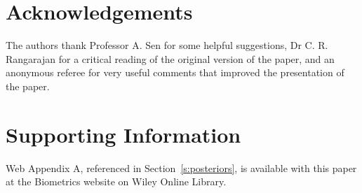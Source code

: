 \documentclass[useAMS,usenatbib]{biom}
\begin{document}
\backmatter


\section*{Acknowledgements}

The authors thank Professor A. Sen for some helpful suggestions,
Dr C. R. Rangarajan for a critical reading of the original version of the
paper, and an anonymous referee for very useful comments that improved
the presentation of the paper.\vspace*{-8pt}




%
%   
% 

  





\section*{Supporting Information}

Web Appendix A, referenced in Section~\ref{s:posteriors}, is available with
this paper at the Biometrics website on Wiley Online
Library.\vspace*{-8pt}
\end{document}
